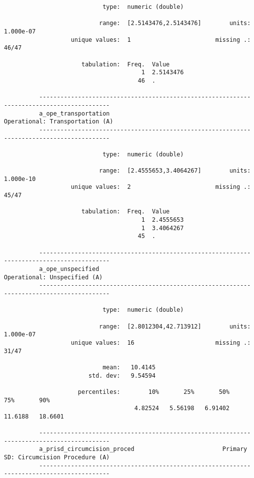\documentclass{article}
\begin{document}
\begin{verbatim}
                            type:  numeric (double)
          
                           range:  [2.5143476,2.5143476]        units:  1.000e-07
                   unique values:  1                        missing .:  46/47
          
                      tabulation:  Freq.  Value
                                       1  2.5143476
                                      46  .
          
          ------------------------------------------------------------------------------------------
          a_ope_transportation                                       Operational: Transportation (A)
          ------------------------------------------------------------------------------------------
          
                            type:  numeric (double)
          
                           range:  [2.4555653,3.4064267]        units:  1.000e-10
                   unique values:  2                        missing .:  45/47
          
                      tabulation:  Freq.  Value
                                       1  2.4555653
                                       1  3.4064267
                                      45  .
          
          ------------------------------------------------------------------------------------------
          a_ope_unspecified                                             Operational: Unspecified (A)
          ------------------------------------------------------------------------------------------
          
                            type:  numeric (double)
          
                           range:  [2.8012304,42.713912]        units:  1.000e-07
                   unique values:  16                       missing .:  31/47
          
                            mean:   10.4145
                        std. dev:   9.54594
          
                     percentiles:        10%       25%       50%       75%       90%
                                     4.82524   5.56198   6.91402   11.6188   18.6601
          
          ------------------------------------------------------------------------------------------
          a_prisd_circumcision_proced                         Primary SD: Circumcision Procedure (A)
          ------------------------------------------------------------------------------------------
          

\end{verbatim}
\end{document}
